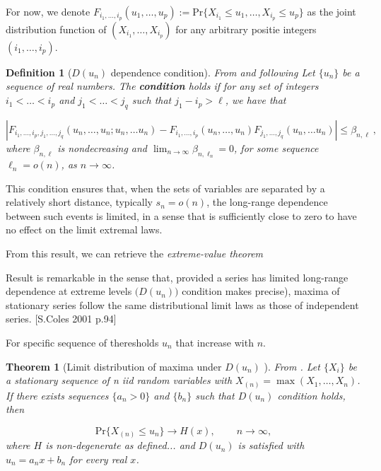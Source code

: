 \documentclass[11pt,a4paper,openany ]{book}
\newtheorem{theorem}{Theorem}[chapter]
\newtheorem{definition}{Definition}[chapter]
\begin{document}
For now, we denote $F_{i_1,\dots,i_p}(u_1,\dots,u_p):=\text{Pr}\{X_{i_1}\leq 
u_1,\dots,X_{i_p}\leq u_p\}$ as the joint distribution function of 
$(X_{i_1},\dots,X_{i_p})$ for any arbitrary positie integers $(i_1,\dots,i_p)$.

\begin{definition}[$D(u_n)$ dependence condition] From \cite{leadbetter_extreme_1974}  and following \cite[pp.373-374, pp.93]{beirlant_statistics_2006,coles_introduction_2001}
	Let $\{u_n\}$ be a sequence of real numbers. The \emph{  \textbf{condition}} holds if for any set of integers $i_1<\dots<i_p$ and $j_1<\dots<j_q$ such that $j_1-i_p>\ell$, we have that 
	
	\begin{equation}
	|F_{i_1,\dots,i_p,j_1,\dots,j_q}(u_n,\dots,u_n;u_n,\dots u_n)-F_{i_1,\dots,i_p}(u_n,\dots,u_n)F_{j_1,\dots,j_q}(u_n,\dots u_n)|\leq \beta_{n,\ell}\ ,
	\end{equation}
	where $\beta_{n,\ell}$ is nondecreasing and  $\displaystyle{\lim_{n \to \infty}}\beta_{n,\ell_n}=0$, for some sequence $\ell_n=o(n)$, as $n\rightarrow\infty$.
\end{definition}

This condition ensures that, when the sets of variables are separated by a relatively short distance, typically $s_n=o(n)$, the long-range dependence between such events is limited, in a sense that is sufficiently close to zero to have no effect on the limit extremal laws.

From this result, we can retrieve the \emph{extreme-value theorem}

Result is remarkable in the sense that, provided a series has limited long-range dependence at extreme levels $\big(D(u_n)\big)$ condition makes precise), maxima of stationary series follow the same distributional limit laws as those of independent series. [S.Coles 2001 p.94] 

For specific sequence of theresholds $u_n$ that increase with $n$.

\begin{theorem}[Limit distribution of maxima under $D({u_n})$ ]
	From \cite{leadbetter_extreme_1974}. 
	Let $\{X_i\}$ be a stationary sequence of n iid random variables with $X_{(n)}=\max (X_1,\dots, X_n)$. If there exists sequences $\{a_n>0\}$ and $\{b_n\}$ such that $D(u_n)$ condition holds, then 
	
	\begin{equation}
	\text{Pr}\{X_{(n)}\leq u_n\}\longrightarrow H(x), \ \ \ \ \ \ \ \, \ \ n\rightarrow\infty,
	\end{equation}
	where $H$ is non-degenerate as defined... and $D(u_n)$ is satisfied with $u_n=a_nx+b_n$ for every real $x$. 
	
\end{theorem}
\end{document}
